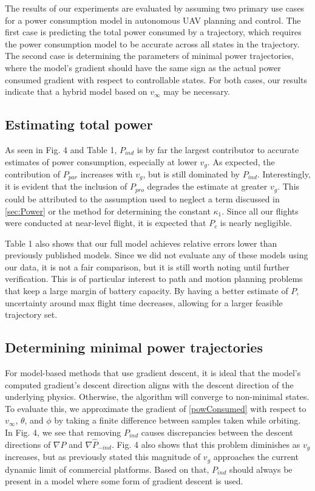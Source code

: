 
The results of our experiments are evaluated by assuming two primary use cases for a power consumption model in autonomous UAV planning and control. The first case is predicting the total power consumed by a trajectory, which requires the power consumption model to be accurate across all states in the trajectory. The second case is determining the parameters of minimal power trajectories, where the model’s gradient should have the same sign as the actual power consumed gradient with respect to controllable states. For both cases, our results indicate that a hybrid model based on $v_\infty$ may be necessary.

\subsection{Estimating total power}
As seen in Fig. 4 and Table 1, $P_{ind}$ is by far the largest contributor to accurate estimates of power consumption, especially at lower $v_g$. As expected, the contribution of $P_{par}$ increases with $v_g$, but is still dominated by $P_{ind}$. Interestingly, it is evident that the inclusion of $P_{pro}$ degrades the estimate at greater $v_g$. This could be attributed to the assumption used to neglect a term discussed in \ref{sec:Power} or the method for determining the constant $\kappa_1$. Since all our flights were conducted at near-level flight, it is expected that $P_c$ is nearly negligible.

Table 1 also shows that our full model achieves relative errors lower than previously published models. Since we did not evaluate any of these models using our data, it is not a fair comparison, but it is still worth noting until further verification. This is of particular interest to path and motion planning problems that keep a large margin of battery capacity. By having a better estimate of $P$, uncertainty around max flight time decreases, allowing for a larger feasible trajectory set.

\subsection{Determining minimal power trajectories}
For model-based methods that use gradient descent, it is ideal that the model's computed gradient's descent direction aligns with the descent direction of the underlying physics. Otherwise, the algorithm will converge to non-minimal states. To evaluate this, we approximate the gradient of \eqref{powConsumed} with respect to $v_\infty$, $\theta$, and $\phi$ by taking a finite difference between samples taken while orbiting. In Fig. 4, we see that removing $P_{ind}$ causes discrepancies between the descent directions of $\nabla P$ and $\nabla \hat{P}_{-ind}$. Fig. 4 also shows that this problem diminishes as $v_g$ increases, but as previously stated this magnitude of $v_g$ approaches the current dynamic limit of commercial platforms. Based on that, $P_{ind}$ should always be present in a model where some form of gradient descent is used.

